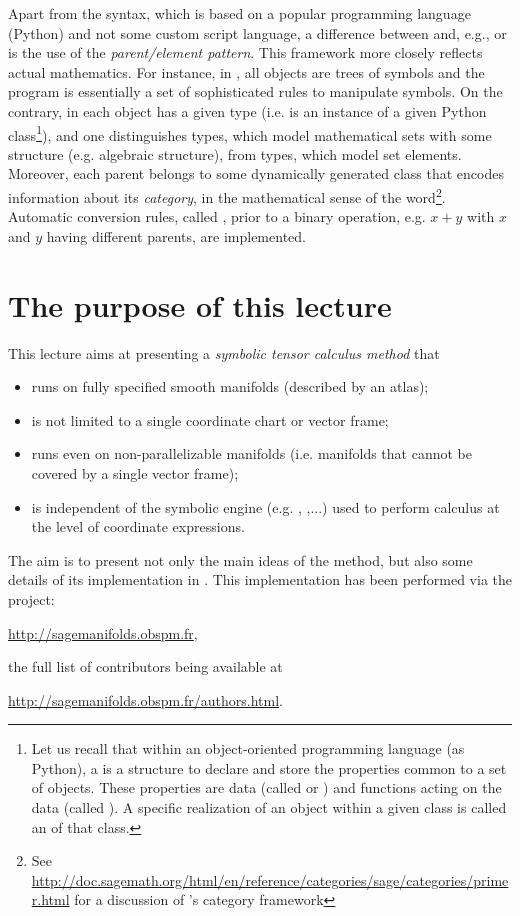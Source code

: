 Apart from the syntax, which is based on a popular programming language
(Python) and not some custom script
language, a difference between \Sage{} and, e.g.,  or 
is the use of the \emph{parent/element pattern}. This framework more closely
reflects actual mathematics.
For instance, in , all objects
are trees of symbols and the program is essentially a set of
sophisticated rules to manipulate symbols. On the contrary, in \Sage{}
each object has a given type (i.e. is an instance of a given
Python class\footnote{Let us
recall that within an object-oriented programming language (as Python),
a  is a structure to declare and store the
properties common to a set of objects. These properties
are data (called
 or ) and functions acting
on the data (called ). A specific realization of an object
within a given class is called an  of that class.}),
and one distinguishes  types, which model mathematical
sets with some structure (e.g. algebraic structure), from  types,
which model set elements. Moreover, each parent belongs to some
dynamically generated class that encodes information
about its \emph{category}, in the mathematical sense of the word\footnote{See
\url{http://doc.sagemath.org/html/en/reference/categories/sage/categories/primer.html}
for a discussion of \Sage{}'s category framework}.
Automatic conversion rules, called ,
prior to a binary operation, e.g. $x+y$ with $x$ and $y$ having different
parents, are implemented.

\section{The purpose of this lecture}

This lecture aims at presenting
a \emph{symbolic tensor calculus method} that
\begin{itemize}
\item runs on fully specified smooth manifolds (described by an atlas);
\item is not limited to a single coordinate chart or vector frame;
\item runs even on non-parallelizable manifolds (i.e. manifolds that cannot
be covered by a single vector frame);
\item is independent of the symbolic engine (e.g.  ,
,...) used to perform calculus at the level of coordinate expressions.
\end{itemize}
The aim is to present not only the main ideas of the method, but also some details of its implementation in \Sage{}. This implementation has been
performed via the  project:
\begin{center}
\url{http://sagemanifolds.obspm.fr},
\end{center}
the full list of contributors being available at
\begin{center}
\url{http://sagemanifolds.obspm.fr/authors.html}.
\end{center}
